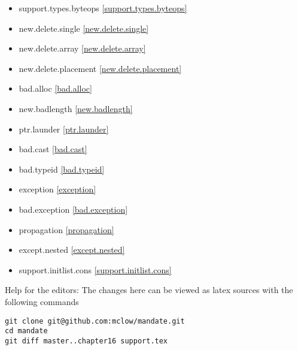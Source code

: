 \begin{itemize}
\item{support.types.byteops  \ref{support.types.byteops}}
\item{new.delete.single      \ref{new.delete.single}}
\item{new.delete.array       \ref{new.delete.array}}
\item{new.delete.placement   \ref{new.delete.placement}}
\item{bad.alloc              \ref{bad.alloc}}
\item{new.badlength          \ref{new.badlength}}
\item{ptr.launder            \ref{ptr.launder}}
\item{bad.cast               \ref{bad.cast}}
\item{bad.typeid             \ref{bad.typeid}}
\item{exception              \ref{exception}}
\item{bad.exception          \ref{bad.exception}}
\item{propagation            \ref{propagation}}
\item{except.nested          \ref{except.nested}}
\item{support.initlist.cons  \ref{support.initlist.cons}}
\end{itemize}

\vfill
Help for the editors: The changes here can be viewed as latex sources with the following commands
\begin{verbatim}
git clone git@github.com:mclow/mandate.git
cd mandate
git diff master..chapter16 support.tex
\end{verbatim}
\newpage
